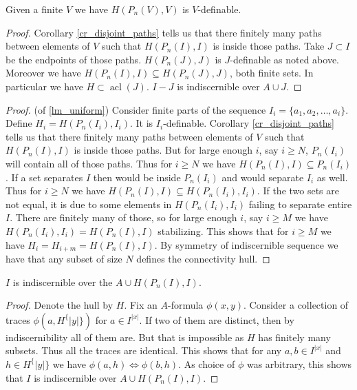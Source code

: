 \documentclass{amsart}
\DeclareMathOperator{\acl}{acl}
\begin{document}
\begin{Note}
	Given a finite $V$ we have $H(P_n(V), V)$ is $V$-definable.
\end{Note}

\begin{proof}
	Corollary \ref{cr_disjoint_paths} tells us that there finitely many paths between elements of $V$ such that $H(P_n(I), I)$ is inside those paths.
	Take $J \subset I$ be the endpoints of those paths.
	$H(P_n(J), J)$ is $J$-definable as noted above.
	Moreover we have $H(P_n(I), I) \subseteq H(P_n(J), J)$, both finite sets.
	In particular we have $H \subset \acl(J)$.
	$I-J$ is indiscernible over $A \cup J$.
	
\end{proof}

\begin{proof}(of \ref{lm_uniform})
	Consider finite parts of the sequence $I_i = \{a_1, a_2, \ldots, a_i\}$.
	Define $H_i = H(P_n(I_i), I_i)$.
	It is $I_i$-definable. %
	Corollary \ref{cr_disjoint_paths} tells us that there finitely many paths between elements of $V$ such that $H(P_n(I), I)$ is inside those paths.
	But for large enough $i$, say $i \geq N$, $P_n(I_i)$ will contain all of those paths.
	Thus for $i \geq N$ we have $H(P_n(I), I) \subseteq P_n(I_i)$.
	If a set separates $I$ then would be inside $P_n(I_i)$ and would separate $I_i$ as well.
	Thus for $i \geq N$ we have $H(P_n(I), I) \subseteq H(P_n(I_i), I_i)$.
	If the two sets are not equal, it is due to some elements in $H(P_n(I_i), I_i)$ failing to separate entire $I$. There are finitely many of those, so for large enough $i$, say $i \geq M$ we have $H(P_n(I_i), I_i) = H(P_n(I), I)$ stabilizing.
	This shows that for $i \geq M$ we have $H_i = H_{i+m} = H(P_n(I), I)$. By symmetry of indiscernible sequence we have that any subset of size $N$ defines the connectivity hull.
\end{proof}

\begin{Lemma} \label{cr_bump}
	$I$ is indiscernible over the $A \cup H(P_n(I), I)$.
\end{Lemma}

\begin{proof}
	Denote the hull by $H$. Fix an $A$-formula $\phi(x,y)$. Consider a collection of traces $\phi(a, H^\{|y|\})$ for $a \in I^{|x|}$. If two of them are distinct, then by indiscernibility all of them are. But that is impossible as $H$ has finitely many subsets. Thus all the traces are identical. This shows that for any $a,b \in I^{|x|}$ and $h \in H^\{|y|\}$ we have $\phi(a, h) \iff \phi(b, h)$. As choice of $\phi$ was arbitrary, this shows that $I$ is indiscernible over $A \cup H(P_n(I), I)$.
\end{proof}
\end{document}
